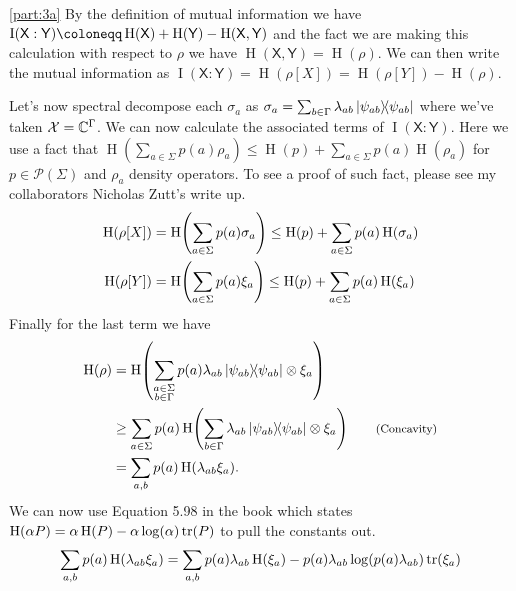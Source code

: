 \documentclass[boxes,pages,color=SeaGreen]{homework}
\renewcommand{\op}[1]{\operatorname{#1}}
\newcommand{\X}{\mathcal{X}}
\renewcommand{\P}{\mathcal{P}}
\newcommand{\reg}[1]{\mathsf{#1}}
\newcommand{\ent}{\operatorname{H}}
\begin{document}
\begin{solution}
    \ref{part:3a}
    By the definition of mutual information we have $\op{I}(\reg{X} : \reg{Y}) \defeq \ent(\reg{X}) + \ent(\reg{Y}) - \ent(\reg{X}, \reg{Y})$ and the fact we are making this calculation with respect to $\rho$ we have $\ent(\reg{X}, \reg{Y}) = \ent(\rho)$.
    We can then write the mutual information as $\op{I}(\reg{X} : \reg{Y}) = \ent(\rho[X]) = \ent(\rho[Y]) - \ent(\rho)$.

    Let's now spectral decompose each $\sigma_a$ as $\sigma_a = \sum_{b\in\Gamma} \lambda_{ab}\ketbra{\psi_{ab}}$ where we've taken $\X = \C^\Gamma$.
    We can now calculate the associated terms of $\op{I}(\reg{X} : \reg{Y})$.
    Here we use a fact that $\ent(\sum_{a \in \Sigma} p(a) \rho_a) \leq \ent(p) + \sum_{a \in \Sigma} p(a) \ent(\rho_a)$ for $p\in\P(\Sigma)$ and $\rho_a$ density operators.
    To see a proof of such fact, please see my collaborators Nicholas Zutt's write up.
    \begin{align*}
        \ent(\rho[X]) & = \ent\!\qty(\sum_{a \in \Sigma} p(a) \sigma_a) \leq \ent(p) + \sum_{a \in \Sigma} p(a) \ent(\sigma_a) \\
        \ent(\rho[Y]) & = \ent\!\qty(\sum_{a \in \Sigma} p(a) \xi_a)    \leq \ent(p) + \sum_{a \in \Sigma} p(a) \ent(\xi_a)
    \end{align*}
    Finally for the last term we have
    \begin{align*}
        \ent(\rho) & = \ent\!\qty(\sum_{\substack{a \in \Sigma                                                                                                  \\ b \in \Gamma}} p(a) \lambda_{ab} \ketbra{\psi_{ab}} \otimes \xi_a) \\
                   & \geq \sum_{a \in \Sigma} p(a) \ent\!\qty(\sum_{b \in \Gamma} \lambda_{ab}\ketbra{\psi_{ab}} \otimes \xi_a) \tag*{\footnotesize(Concavity)} \\
                   & = \sum_{a,b} p(a) \ent\!\qty(\lambda_{ab} \xi_a).
    \end{align*}
    We can now use Equation 5.98 in the book which states $\ent(\alpha P) = \alpha\ent(P) - \alpha\log(\alpha)\tr(P)$ to pull the constants out.
    \begin{align*}
        \sum_{a,b} p(a) \ent\!\qty(\lambda_{ab} \xi_a) & = \sum_{a,b} p(a) \lambda_{ab}\ent(\xi_a) - p(a) \lambda_{ab}\log(p(a)\lambda_{ab})\tr(\xi_a)                                                                                                           \\

\end{align*}
\end{solution}
\end{document}
